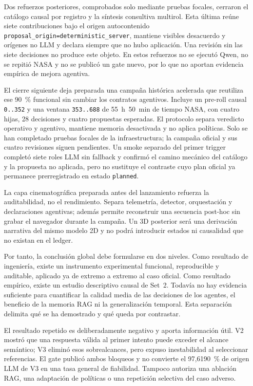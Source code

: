 Dos refuerzos posteriores, comprobados solo mediante pruebas focales, cerraron
el catálogo causal por registro y la síntesis consultiva multirol. Esta última
reúne siete contribuciones bajo el origen autocontenido
\texttt{proposal\_origin=deterministic\_server}, mantiene visibles desacuerdo
y orígenes no LLM y declara siempre que no hubo aplicación. Una revisión sin
las siete decisiones no produce este objeto. En estos refuerzos no se ejecutó
Qwen, no se repitió NASA y no se publicó un gate nuevo, por lo que no aportan
evidencia empírica de mejora agentiva.

El cierre siguiente deja preparada una campaña histórica acelerada que reutiliza
ese 90~\% funcional sin cambiar los contratos agentivos. Incluye un pre-roll
causal \texttt{0..352} y una ventana \texttt{353..688} de 55~h~50~min de tiempo
NASA, con cuatro hijas, 28 decisiones y cuatro propuestas esperadas. El protocolo
separa veredicto operativo y agentivo, mantiene memoria desactivada y no aplica
políticas. Solo se han completado pruebas focales de la infraestructura; la
campaña oficial y sus cuatro revisiones siguen pendientes. Un smoke separado
del primer trigger completó siete roles LLM sin fallback y confirmó el camino
mecánico del catálogo y la propuesta no aplicada, pero no sustituye el
contraste cuyo plan oficial ya permanece prerregistrado en estado
\texttt{planned}.

La capa cinematográfica preparada antes del lanzamiento refuerza la
auditabilidad, no el rendimiento. Separa telemetría, detector, orquestación y
declaraciones agentivas; además permite reconstruir una secuencia post-hoc sin
grabar el navegador durante la campaña. Un 3D posterior será una derivación
narrativa del mismo modelo 2D y no podrá introducir estados ni causalidad que no
existan en el ledger.

Por tanto, la conclusión global debe formularse en dos niveles. Como resultado
de ingeniería, existe un instrumento experimental funcional, reproducible y
auditable, aplicado ya de extremo a extremo al caso oficial. Como resultado
empírico, existe un estudio descriptivo causal de Set~2. Todavía no hay evidencia
suficiente para cuantificar la calidad media de las decisiones de los agentes,
el beneficio de la memoria RAG ni la generalización temporal. Esta separación
delimita qué se ha demostrado y qué queda por contrastar.

El resultado repetido es deliberadamente negativo y aporta información útil.
V2 mostró que una respuesta válida al primer intento puede exceder el alcance
semántico; V3 eliminó esos sobrealcances, pero expuso inestabilidad al seleccionar
referencias. El gate publicó ambos bloqueos y no convierte el 97,6190~\% de
origen LLM de V3 en una tasa general de fiabilidad. Tampoco autoriza una ablación
RAG, una adaptación de políticas o una repetición selectiva del caso adverso.

